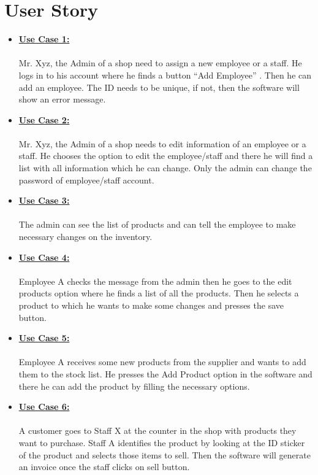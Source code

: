 \documentclass{article}
\begin{document}
\section*{\LARGE User Story}
\large 
\begin{itemize}
    \item \large \underline{\textbf{Use Case 1:}}\\\\
Mr. Xyz, the Admin of a shop need to assign a new employee or a staff. He logs in to his account where he finds a button “Add Employee” . Then he can add an employee. The ID needs to be unique, if not, then the software will show an error message.\\
    \item \large \underline{\textbf{Use Case 2:}}\\\\
    Mr. Xyz, the Admin of a shop needs to edit information of an employee or a staff. He chooses the option to edit the employee/staff and there he will find a list with all information which he can change. Only the admin can change the password of employee/staff account.\\
    \item \large \underline{\textbf{Use Case 3:}}\\\\
    The admin can see the list of products and can tell the employee to make necessary changes on the inventory.\\
    \item \large \underline{\textbf{Use Case 4:}}\\\\
    Employee A checks the message from the admin then he goes to the edit products option where he finds a list of all the products. Then he selects a product to which he wants to make some changes and presses the save button.\\
    \item \large \underline{\textbf{Use Case 5:}}\\\\
    Employee A receives some new products from the supplier and wants to add them to the stock list. He presses the Add Product option in the software and there he can add the product by filling the necessary options.\\
    \item \large \underline{\textbf{Use Case 6:}}\\\\
    A customer goes to Staff X at the counter in the shop with products they want to purchase. Staff A identifies the product by looking at the ID sticker of the product and selects those items to sell. Then the software will generate an invoice once the staff clicks on sell button.\\

\end{itemize}
{}
\end{document}
